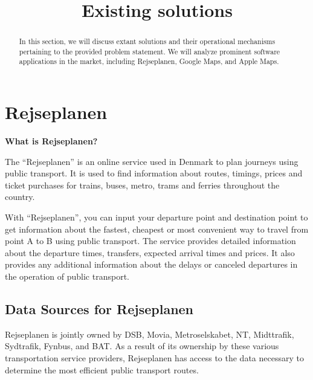 \documentclass[11pt]{article}
\title{Existing solutions}
\begin{document}
    \maketitle
    \begin{abstract}
        In this section, we will discuss extant solutions and their operational mechanisms pertaining to the provided
        problem statement.
        We will analyze prominent software applications in the market,
        including Rejseplanen, Google Maps, and Apple Maps.
    \end{abstract}


    \section{Rejseplanen}\label{sec:rejseplanen}

    \textbf{What is Rejseplanen?}

    The ``Rejseplanen'' is an online service used in Denmark to plan journeys using public transport.
    It is used to find information about routes, timings, prices and ticket purchases for trains, buses, metro, trams
    and ferries throughout the country.\cite{Rejseplanen} \newline

    With ``Rejseplanen'', you can input your departure point and destination point to get information about the fastest,
    cheapest or most convenient way to travel from point A to B using public transport.
    The service provides detailed information about the departure times, transfers, expected arrival times and prices.
    It also provides any additional information about the delays or canceled departures in the operation of public
    transport.\cite{Rejseplanen}\newline

    \subsection{Data Sources for Rejseplanen}\label{subsec:where-does-rejseplanen-get-their-data-from?}

    Rejseplanen is jointly owned by DSB, Movia, Metroselskabet, NT, Midttrafik, Sydtrafik, Fynbus, and BAT.
    As a result of its ownership by these various transportation service providers, Rejseplanen has access to the
    data necessary to determine the most efficient public transport routes.
\end{document}
